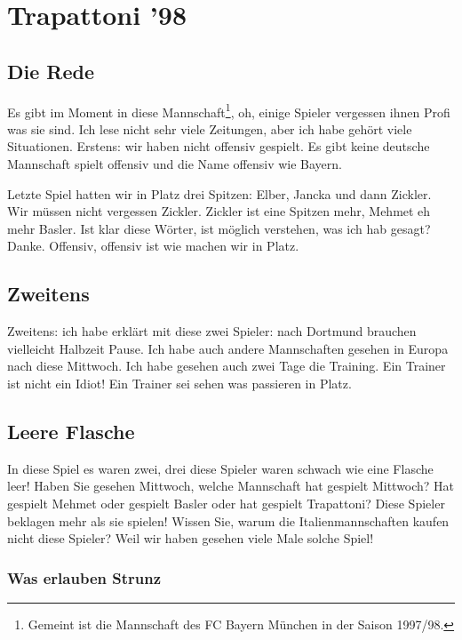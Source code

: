 \documentclass[ngerman, 11pt, a4paper]{article}
\begin{document}

\section{Trapattoni '98}

\subsection{Die Rede}

Es gibt im Moment in diese Mannschaft\footnote{Gemeint ist die Mannschaft des FC Bayern München in der Saison 1997/98.}, oh, einige Spieler vergessen ihnen Profi was sie sind. Ich lese nicht sehr viele Zeitungen, aber ich habe gehört viele Situationen. Erstens: wir haben nicht offensiv gespielt. Es gibt keine deutsche Mannschaft spielt offensiv und die Name offensiv wie Bayern.

Letzte Spiel hatten wir in Platz drei Spitzen: Elber, Jancka und dann Zickler. Wir müssen nicht vergessen Zickler. Zickler ist eine Spitzen mehr, Mehmet eh mehr Basler. Ist klar diese Wörter, ist möglich verstehen, was ich hab gesagt? Danke. Offensiv, offensiv ist wie machen wir in Platz.

\subsection{Zweitens}

 Zweitens: ich habe erklärt mit diese zwei Spieler: nach Dortmund brauchen vielleicht Halbzeit Pause. Ich habe auch andere Mannschaften gesehen in Europa nach diese Mittwoch. Ich habe gesehen auch zwei Tage die Training. Ein Trainer ist nicht ein Idiot! Ein Trainer sei sehen was passieren in Platz.
 
\subsection{Leere Flasche}

 In diese Spiel es waren zwei, drei diese Spieler waren schwach wie eine Flasche leer! Haben Sie gesehen Mittwoch, welche Mannschaft hat gespielt Mittwoch? Hat gespielt Mehmet oder gespielt Basler oder hat gespielt Trapattoni? Diese Spieler beklagen mehr als sie spielen! Wissen Sie, warum die Italienmannschaften kaufen nicht diese Spieler? Weil wir haben gesehen viele Male solche Spiel!
 
 \subsubsection{Was erlauben Strunz}
 
\end{document}
